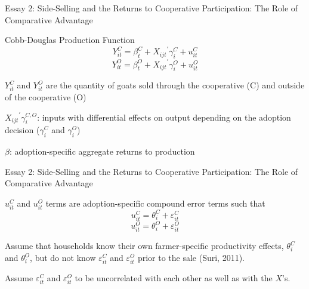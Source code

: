 \documentclass[aspectratio=169]{beamer}
\newenvironment{wideitemize}{\itemize\addtolength{\itemsep}{10pt}}{\enditemize}
\begin{document}
\begin{frame}{Essay 2: Side-Selling and the Returns to Cooperative Participation: The Role of Comparative Advantage}
        \begin{wideitemize}
        \item Cobb-Douglas Production Function
        \begin{equation} \label{eq:E2_yield.C}
            Y^{C}_{it} = \beta^{C}_{t} + {X_{ijt}}^\prime \gamma^{C}_{i} + u^{C}_{it}
        \end{equation}   
        \begin{equation} \label{eq:E2_yield.O}    
            Y^{O}_{it} = \beta^{O}_{t} + {X_{ijt}}^\prime \gamma^{O}_{i} + u^{O}_{it}
        \end{equation}
        \item $Y^{C}_{it}$ and $Y^{O}_{it}$ are the quantity of goats sold through the cooperative (C) and outside of the cooperative (O)
        \item ${X_{ijt}}^\prime \gamma^{C,O}_{i}$: inputs with differential effects on output depending on the adoption decision ($\gamma^{C}_{i}$ and $\gamma^{O}_{i}$)
        \item $\beta$: adoption-specific aggregate returns to production
    \end{wideitemize}
\end{frame}


\begin{frame}{Essay 2: Side-Selling and the Returns to Cooperative Participation: The Role of Comparative Advantage}
    \begin{wideitemize}
        \item $u^{C}_{it}$ and $u^{O}_{it}$ terms are adoption-specific compound error terms such that \vspace{.5cm}
    \end{wideitemize}
    \begin{equation} \label{eq:E2_u.C}
        u^{C}_{it} = \theta^{C}_{i} + \varepsilon^{C}_{it}
    \end{equation}
    \begin{equation} \label{eq:E2_u.O}
        u^{O}_{it} = \theta^{O}_{i} + \varepsilon^{O}_{it}
    \end{equation}
    \begin{wideitemize}
        \item Assume that households know their own farmer-specific productivity effects, $\theta^{C}_{i}$ and $\theta^{O}_{i}$, but do not know $\varepsilon^{C}_{it}$ and $\varepsilon^{O}_{it}$ prior to the sale (Suri, 2011). 
        \item Assume $\varepsilon^{C}_{it}$ and $\varepsilon^{O}_{it}$ to be uncorrelated with each other as well as with the $X$’s.
    \end{wideitemize}
\end{frame}
\end{document}

